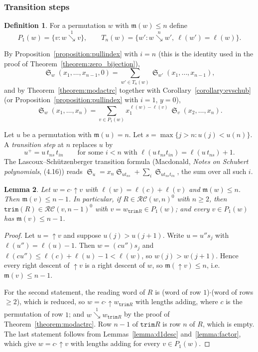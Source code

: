 \documentclass{amsart}
\newtheorem{lemma}{Lemma}[subsection]
\theoremstyle{definition}
\newtheorem{definition}[lemma]{Definition}
\theoremstyle{remark}
\numberwithin{equation}{subsection}
\DeclareMathOperator{\sch}{\mathfrak{S}}
\newcommand{\downvar}[1]{\stackrel{#1}{\searrow}}
\newcommand{\wof}[1]{w_{#1}}
\newcommand{\trm}{\mathtt{trim}}
\newcommand{\RC}{\mathcal{RC}}
\newcommand{\maxd}{\mathfrak{m}}
\begin{document}
\subsubsection*{Transition steps}
\begin{definition}
For a permutation $w$ with $\maxd(w)\le n$ define
\[
P_1(w)=\{v : w\downvar{1}v\},\qquad
T_n(w)=\{w' : w\downvar{n}w',\ \ell(w')=\ell(w)\}.
\]
\end{definition}

By Proposition~\ref{proposition:pullindex} with $i=n$ (this is the identity used in the proof of Theorem~\ref{theorem:zero_bijection}),
\begin{equation}\label{E:Tn}
\sch_w(x_1,\dots,x_{n-1},0)=\sum_{w'\in T_n(w)}\sch_{w'}(x_1,\dots,x_{n-1}),
\end{equation}
and by Theorem~\ref{theorem:modactrc} together with Corollary~\ref{corollary:evschub} (or Proposition~\ref{proposition:pullindex} with $i=1$, $y=0$),
\begin{equation}\label{E:P1}
\sch_w(x_1,\dots,x_n)=\sum_{v\in P_1(w)}x_1^{\ell(w)-\ell(v)}\,\sch_v(x_2,\dots,x_n).
\end{equation}


Let $u$ be a permutation with $\maxd(u)=n$. Let $s=\max\{j>n : u(j)<u(n)\}$. A \emph{transition step} at $n$ replaces $u$ by
\[
u^{+}=u\,t_{ns}\,t_{in}\qquad\text{for some } i<n \text{ with } \ell(u\,t_{ns}t_{in})=\ell(u\,t_{ns})+1 .
\]
The Lascoux--Sch\"utzenberger transition formula (Macdonald, \emph{Notes on Schubert polynomials}, (4.16)) reads
$\sch_u=x_n\sch_{u t_{ns}}+\sum_i \sch_{u t_{ns}t_{in}}$, the sum over all such $i$.

\begin{lemma}\label{L:trim}
Let $w=c\cdot{\uparrow}v$ with $\ell(w)=\ell(c)+\ell(v)$ and $\maxd(w)\le n$. Then $\maxd(v)\le n-1$.
In particular, if $R\in\RC(w,n)^0$ with $n\ge2$, then $\trm(R)\in\RC(v,n-1)^0$ with $v=\wof{\trm R}\in P_1(w)$;
and every $v\in P_1(w)$ has $\maxd(v)\le n-1$.
\end{lemma}
\begin{proof}
Let $u={\uparrow}v$ and suppose $u(j)>u(j+1)$. Write $u=u''s_j$ with $\ell(u'')=\ell(u)-1$. Then
$w=(cu'')s_j$ and $\ell(cu'')\le \ell(c)+\ell(u)-1<\ell(w)$, so $w(j)>w(j+1)$. Hence every right descent of
${\uparrow}v$ is a right descent of $w$, so $\maxd({\uparrow}v)\le n$, i.e.\ $\maxd(v)\le n-1$.

For the second statement, the reading word of $R$ is (word of row $1$)$\cdot$(word of rows $\ge2$), which is reduced,
so $w=c\cdot{\uparrow}\wof{\trm R}$ with lengths adding, where $c$ is the permutation of row $1$; and $w\downvar{1}\wof{\trm R}$
by the proof of Theorem~\ref{theorem:modactrc}. Row $n-1$ of $\trm R$ is row $n$ of $R$, which is empty.
The last statement follows from Lemmas~\ref{lemma:d1desc} and~\ref{lemma:factor}, which give $w=c\cdot{\uparrow}v$ with lengths adding for every $v\in P_1(w)$.
\end{proof}
\end{document}
